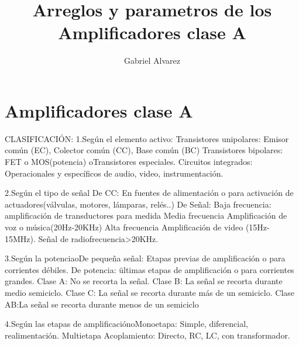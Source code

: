 \documentclass[10pt,a4paper]{article}
\author{Gabriel Alvarez}
\title{Arreglos y parametros de los Amplificadores clase A}
\begin{document}
\maketitle\section{Amplificadores clase A}
CLASIFICACIÓN:
1.Según el elemento activo:
Transistores unipolares: Emisor común (EC), Colector común (CC), Base común (BC) Transistores bipolares: FET o MOS(potencia) oTransistores especiales. 
Circuitos integrados: Operacionales y específicos de audio, video, instrumentación. 

2.Según el tipo de señal De CC: 
En fuentes de alimentación o para activación de actuadores(válvulas, motores, lámparas, relés..) 
De Señal: 
Baja frecuencia: 
amplificación de transductores para medida Media frecuencia 
Amplificación de voz o música(20Hz-20KHz) 
Alta frecuencia
Amplificación de video (15Hz-15MHz). 
Señal de radiofrecuencia>20KHz. 

3.Según la potenciaoDe pequeña señal: 
Etapas previas de amplificación o para corrientes débiles. 
De potencia: ültimas etapas de amplificación o para corrientes grandes. 
Clase A: No se recorta la señal. 
Clase B: La señal se recorta durante medio semiciclo. 
Clase C: La señal se recorta durante más de un semiciclo. 
Clase AB:La señal se recorta durante menos de un semiciclo 

4.Según las etapas de amplificaciónoMonoetapa: 
Simple, diferencial, realimentación. 
Multietapa 
Acoplamiento: Directo, RC, LC, con transformador.
\end{document}
